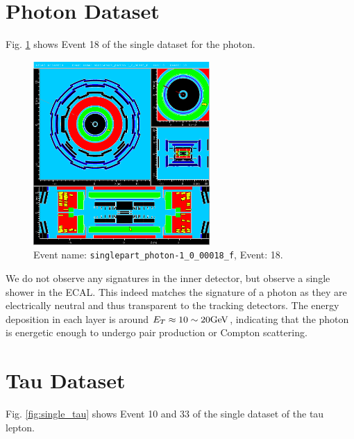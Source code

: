 \documentclass[a4paper]{report}
\numberwithin{equation}{section}
\begin{document}
\section{Photon Dataset}

Fig. \ref{fig:single_photon} shows Event 18 of the single dataset for the photon.

\begin{figure}[htpb]
    \centering
    \includegraphics[width=0.6\textwidth]{photon_event18.eps}
    \caption{Event name: \texttt{singlepart\_photon-1\_0\_00018\_f}, Event: 18. }
    \label{fig:single_photon}
\end{figure}

We do not observe any signatures in the inner detector, but observe a single shower in the ECAL. This indeed matches the signature 
of a photon as they are electrically neutral and thus transparent to the tracking detectors. The energy deposition in each 
layer is around $E_T \approx 10 \sim 20 \si[]{\giga\electronvolt}$, indicating that the photon is energetic enough to undergo 
pair production or Compton scattering. \par 

\section{Tau Dataset}

Fig. \ref{fig:single_tau} shows Event 10 and 33 of the single dataset of the tau lepton. 
\end{document}
